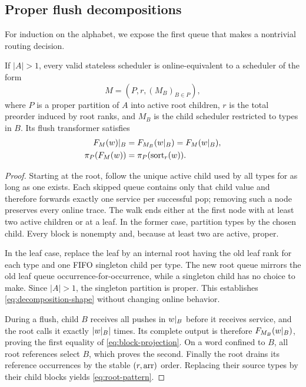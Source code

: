 \subsection{Proper flush decompositions}
\label{sec:decompositions}

For induction on the alphabet, we expose the first queue that makes a
nontrivial routing decision.

\begin{lemma}
\label{lem:decomposition}
If \(|A|>1\), every valid stateless scheduler is online-equivalent to a
scheduler of the form
\begin{equation}
 M=(P,r,(M_B)_{B\in P}),
 \label{eq:decomposition-shape}
\end{equation}
where \(P\) is a proper partition of \(A\) into active root children, \(r\) is
the total preorder induced by root ranks, and \(M_B\) is the child scheduler
restricted to types in \(B\).  Its flush transformer satisfies
\begin{align}
 F_M(w)\mathord{|}_{B}
   &=F_{M_B}(w\mathord{|}_{B})
    =F_M(w\mathord{|}_{B}),
    \label{eq:block-projection}\\
 \pi_{P}(F_M(w))
   &=\pi_{P}(\operatorname{sort}_r(w)).
    \label{eq:root-pattern}
\end{align}
\end{lemma}

\begin{proof}
Starting at the root, follow the unique active child used by all types for as
long as one exists.  Each skipped queue contains only that child value and
therefore forwards exactly one service per successful pop; removing such a
node preserves every online trace.  The walk ends either at the first node with
at least two active children or at a leaf.  In the former case, partition types
by the chosen child.  Every block is nonempty and, because at least two are
active, proper.

In the leaf case, replace the leaf by an internal root having the old leaf rank
for each type and one FIFO singleton child per type.  The new root queue mirrors
the old leaf queue occurrence-for-occurrence, while a singleton child has no
choice to make.  Since \(|A|>1\), the singleton partition is proper.  This
establishes \autoref{eq:decomposition-shape} without changing online behavior.

During a flush, child \(B\) receives all pushes in
\(w\mathord{|}_{B}\) before it receives service, and the root calls it exactly
\(|w\mathord{|}_{B}|\) times.  Its complete output is therefore
\(F_{M_B}(w\mathord{|}_{B})\), proving the first equality of
\autoref{eq:block-projection}.  On a word confined to \(B\), all root references
select \(B\), which proves the second.  Finally the root drains its reference
occurrences by the stable \((r,\operatorname{arr})\) order.  Replacing their source types by
their child blocks yields \autoref{eq:root-pattern}.
\end{proof}

